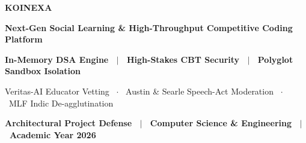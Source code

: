 \documentclass[aspectratio=169,10pt]{beamer}
\begin{document}
\begin{frame}[plain]
  \vspace*{1.2cm}
  \begin{center}
    {\fontsize{38}{44}\selectfont\textbf{\textcolor{KoinexaRed}{KOINEXA}}}\par
    \vspace{0.35cm}
    {\fontsize{15}{19}\selectfont\textbf{\textcolor{KoinexaOrange}{Next-Gen Social Learning \& High-Throughput Competitive Coding Platform}}}\par
    \vspace{0.45cm}
    {\fontsize{11}{14}\selectfont\textbf{In-Memory DSA Engine \ $|$ \ High-Stakes CBT Security \ $|$ \ Polyglot Sandbox Isolation}}\par
    \vspace{0.2cm}
    {\fontsize{9.5}{12.5}\selectfont\textcolor{KoinexaGray}{Veritas-AI Educator Vetting \ $\cdot$ \ Austin \& Searle Speech-Act Moderation \ $\cdot$ \ MLF Indic De-agglutination}}\par
    \vspace{1.0cm}
    {\fontsize{10}{13}\selectfont\textbf{\textcolor{KoinexaRed}{Architectural Project Defense \ $|$ \ Computer Science \& Engineering \ $|$ \ Academic Year 2026}}}
  \end{center}
\end{frame}
\end{document}
